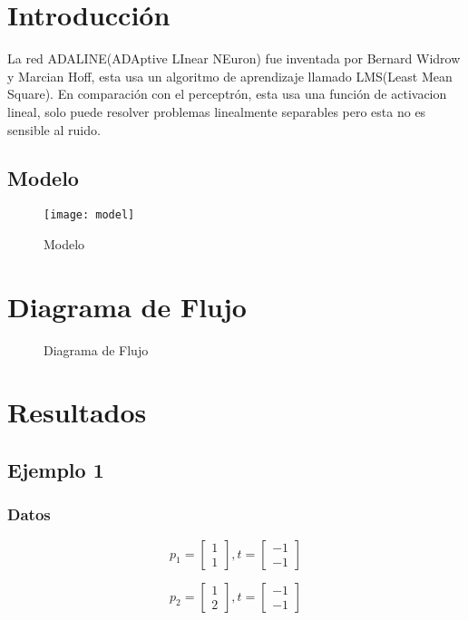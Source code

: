 \documentclass{article}
\begin{document}
\maketitle
\tableofcontents
\section{Introducción}
La red ADALINE(ADAptive LInear NEuron) fue inventada por Bernard Widrow y Marcian Hoff, esta usa un algoritmo de aprendizaje llamado LMS(Least Mean Square). En comparación con el perceptrón, esta usa una función de activacion lineal, solo puede resolver problemas linealmente separables pero esta no es sensible al ruido.
\newpage
\subsection{Modelo}
\begin{figure}[h!]
	\caption{Modelo}
	\centering
	\texttt{[image: model]}
\end{figure}
\newpage
\section{Diagrama de Flujo}
\begin{figure}[htpb]
	\centering
	
	\caption{Diagrama de Flujo}
\end{figure}
\newpage
\section{Resultados}
\subsection{Ejemplo 1}
\subsubsection{Datos}
\[p_1=
\begin{bmatrix}
1\\
1
\end{bmatrix}
, t = \begin{bmatrix}
-1\\
-1
\end{bmatrix}
\]

\[p_2=
\begin{bmatrix}
1\\
2
\end{bmatrix}
, t = \begin{bmatrix}
-1\\
-1
\end{bmatrix}
\]
\end{document}
